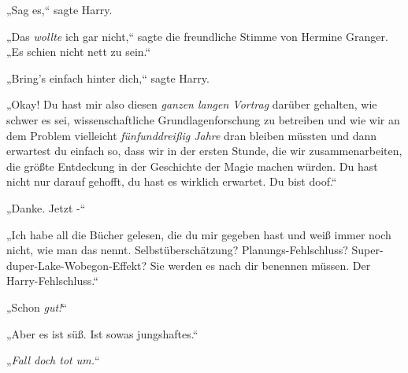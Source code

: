 „Sag es,“ sagte Harry.

„Das \emph{wollte} ich gar nicht,“ sagte die freundliche Stimme von Hermine Granger. „Es schien nicht nett zu sein.“

„Bring's einfach hinter dich,“ sagte Harry.

„Okay! Du hast mir also diesen \emph{ganzen langen Vortrag} darüber gehalten, wie schwer es sei, wissenschaftliche Grundlagenforschung zu betreiben und wie wir an dem Problem vielleicht \emph{fünfunddreißig Jahre} dran bleiben müssten und dann erwartest du einfach so, dass wir in der ersten Stunde, die wir zusammenarbeiten, die größte Entdeckung in der Geschichte der Magie machen würden. Du hast nicht nur darauf gehofft, du hast es wirklich erwartet. Du bist doof.“

„Danke. Jetzt -“

„Ich habe all die Bücher gelesen, die du mir gegeben hast und weiß immer noch nicht, wie man das nennt. Selbstüberschätzung? Planungs-Fehlschluss? Super-duper-Lake-Wobegon-Effekt? Sie werden es nach dir benennen müssen. Der Harry-Fehlschluss.“%

„Schon \emph{gut!}“

„Aber es ist süß. Ist sowas jungshaftes.“

„\emph{Fall doch tot um.}“

